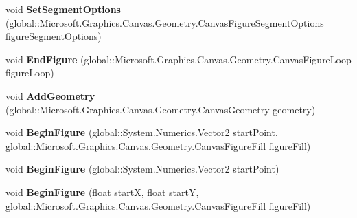 \begin{DoxyCompactItemize}
\item 
\mbox{\label{interface_microsoft_1_1_graphics_1_1_canvas_1_1_geometry_1_1_i_canvas_path_builder_af370ca945a2f94ff7cc968d77512fd8d}} 
void {\bfseries Set\+Segment\+Options} (global\+::\+Microsoft.\+Graphics.\+Canvas.\+Geometry.\+Canvas\+Figure\+Segment\+Options figure\+Segment\+Options)
\item 
\mbox{\label{interface_microsoft_1_1_graphics_1_1_canvas_1_1_geometry_1_1_i_canvas_path_builder_a9ce31a3bed6a5118d4e16140a1c21484}} 
void {\bfseries End\+Figure} (global\+::\+Microsoft.\+Graphics.\+Canvas.\+Geometry.\+Canvas\+Figure\+Loop figure\+Loop)
\item 
\mbox{\label{interface_microsoft_1_1_graphics_1_1_canvas_1_1_geometry_1_1_i_canvas_path_builder_aa46920a62d2d31a461ff0078c07432cf}} 
void {\bfseries Add\+Geometry} (global\+::\+Microsoft.\+Graphics.\+Canvas.\+Geometry.\+Canvas\+Geometry geometry)
\item 
\mbox{\label{interface_microsoft_1_1_graphics_1_1_canvas_1_1_geometry_1_1_i_canvas_path_builder_afe2a6e4649d8c29aaa44335cebe61dc5}} 
void {\bfseries Begin\+Figure} (global\+::\+System.\+Numerics.\+Vector2 start\+Point, global\+::\+Microsoft.\+Graphics.\+Canvas.\+Geometry.\+Canvas\+Figure\+Fill figure\+Fill)
\item 
\mbox{\label{interface_microsoft_1_1_graphics_1_1_canvas_1_1_geometry_1_1_i_canvas_path_builder_aa01f534a0d57d542b6e74f2939e13d54}} 
void {\bfseries Begin\+Figure} (global\+::\+System.\+Numerics.\+Vector2 start\+Point)
\item 
\mbox{\label{interface_microsoft_1_1_graphics_1_1_canvas_1_1_geometry_1_1_i_canvas_path_builder_ab65fd089f5c2a5bdb2e36fe9c552044a}} 
void {\bfseries Begin\+Figure} (float startX, float startY, global\+::\+Microsoft.\+Graphics.\+Canvas.\+Geometry.\+Canvas\+Figure\+Fill figure\+Fill)

\end{DoxyCompactItemize}
